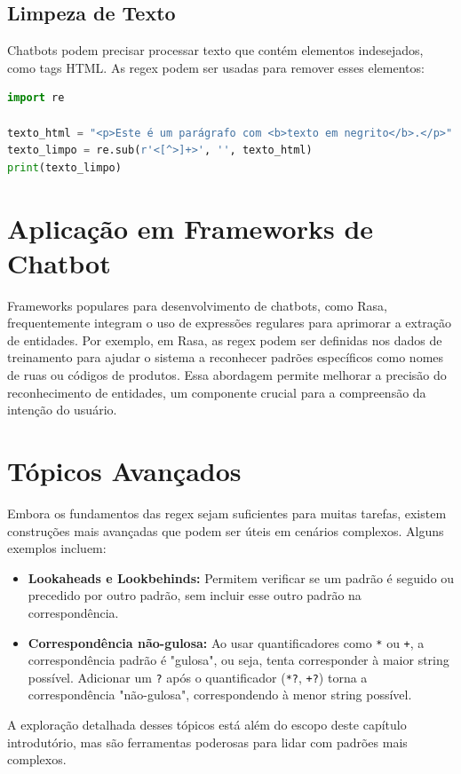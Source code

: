 \documentclass[14pt,a4paper,oneside]{book}
\begin{document}
\subsection{Limpeza de Texto}
Chatbots podem precisar processar texto que contém elementos indesejados, como tags HTML. As regex podem ser usadas para remover esses elementos:
\begin{lstlisting}[language=Python, caption=Limpeza de texto removendo tags HTML, label=lst:limpeza_html]
import re

texto_html = "<p>Este é um parágrafo com <b>texto em negrito</b>.</p>"
texto_limpo = re.sub(r'<[^>]+>', '', texto_html)
print(texto_limpo)
\end{lstlisting}


\section{Aplicação em Frameworks de Chatbot}
Frameworks populares para desenvolvimento de chatbots, como Rasa, frequentemente integram o uso de expressões regulares para aprimorar a extração de entidades. Por exemplo, em Rasa, as regex podem ser definidas nos dados de treinamento para ajudar o sistema a reconhecer padrões específicos como nomes de ruas ou códigos de produtos. Essa abordagem permite melhorar a precisão do reconhecimento de entidades, um componente crucial para a compreensão da intenção do usuário.

\section{Tópicos Avançados}
Embora os fundamentos das regex sejam suficientes para muitas tarefas, existem construções mais avançadas que podem ser úteis em cenários complexos. Alguns exemplos incluem:
\begin{itemize}
    \item \textbf{Lookaheads e Lookbehinds:} Permitem verificar se um padrão é seguido ou precedido por outro padrão, sem incluir esse outro padrão na correspondência.
    \item \textbf{Correspondência não-gulosa:} Ao usar quantificadores como \texttt{*} ou \texttt{+}, a correspondência padrão é "gulosa", ou seja, tenta corresponder à maior string possível. Adicionar um \texttt{?} após o quantificador (\texttt{*?}, \texttt{+?}) torna a correspondência "não-gulosa", correspondendo à menor string possível.
\end{itemize}
A exploração detalhada desses tópicos está além do escopo deste capítulo introdutório, mas são ferramentas poderosas para lidar com padrões mais complexos.
\end{document}

